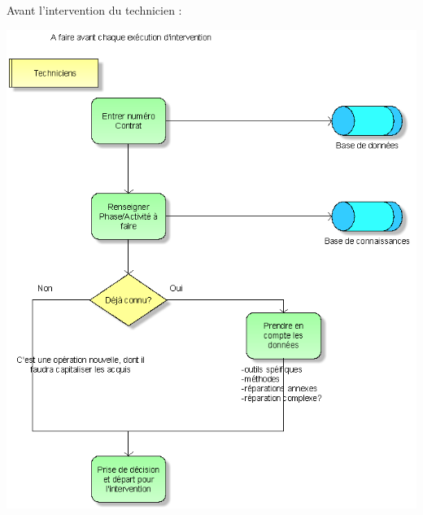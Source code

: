 Avant l'intervention du technicien :
\begin {center}
\includegraphics[width=\textwidth]{png_cible_fonctionnelle/AideTechnicienAvantInterventionTechnique.png}
\end {center}

